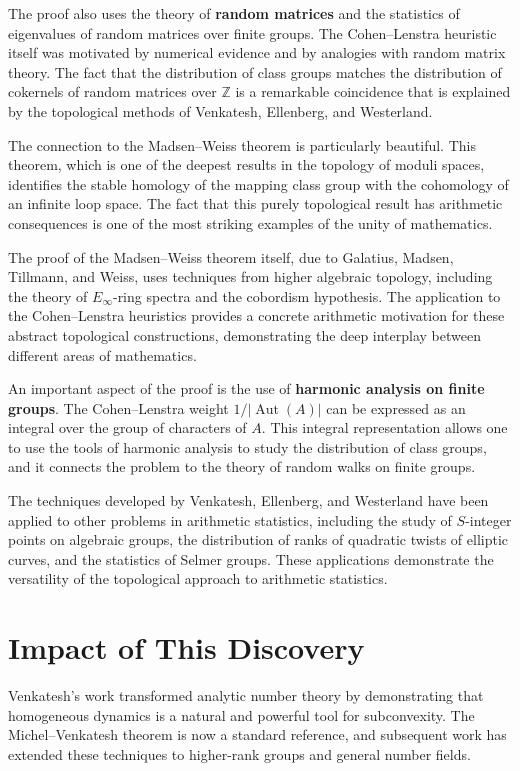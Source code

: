 The proof also uses the theory of \textbf{random matrices} and the statistics of eigenvalues of random matrices over finite groups. The Cohen--Lenstra heuristic itself was motivated by numerical evidence and by analogies with random matrix theory. The fact that the distribution of class groups matches the distribution of cokernels of random matrices over $\mathbb{Z}$ is a remarkable coincidence that is explained by the topological methods of Venkatesh, Ellenberg, and Westerland.

The connection to the Madsen--Weiss theorem is particularly beautiful. This theorem, which is one of the deepest results in the topology of moduli spaces, identifies the stable homology of the mapping class group with the cohomology of an infinite loop space. The fact that this purely topological result has arithmetic consequences is one of the most striking examples of the unity of mathematics.

The proof of the Madsen--Weiss theorem itself, due to Galatius, Madsen, Tillmann, and Weiss, uses techniques from higher algebraic topology, including the theory of $E_\infty$-ring spectra and the cobordism hypothesis. The application to the Cohen--Lenstra heuristics provides a concrete arithmetic motivation for these abstract topological constructions, demonstrating the deep interplay between different areas of mathematics.

An important aspect of the proof is the use of \textbf{harmonic analysis on finite groups}. The Cohen--Lenstra weight $1/|\operatorname{Aut}(A)|$ can be expressed as an integral over the group of characters of $A$. This integral representation allows one to use the tools of harmonic analysis to study the distribution of class groups, and it connects the problem to the theory of random walks on finite groups.

The techniques developed by Venkatesh, Ellenberg, and Westerland have been applied to other problems in arithmetic statistics, including the study of $S$-integer points on algebraic groups, the distribution of ranks of quadratic twists of elliptic curves, and the statistics of Selmer groups. These applications demonstrate the versatility of the topological approach to arithmetic statistics.

\section{Impact of This Discovery}

Venkatesh's work \cite{venkatesh2018} transformed analytic number theory by demonstrating that homogeneous dynamics is a natural and powerful tool for subconvexity. The Michel--Venkatesh theorem is now a standard reference, and subsequent work has extended these techniques to higher-rank groups and general number fields.


